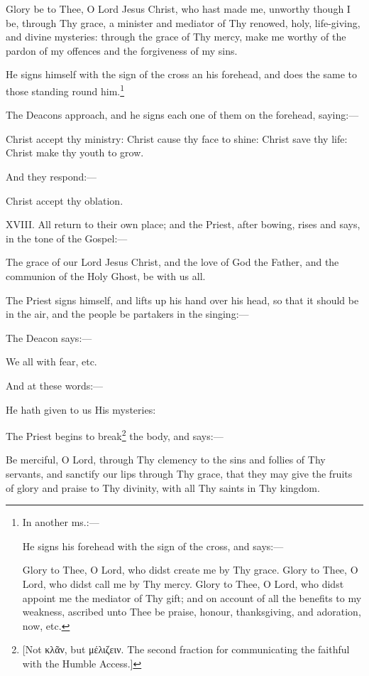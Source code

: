 Glory be to Thee, O Lord Jesus Christ, who hast made me, unworthy though I be, through Thy grace, a minister and mediator of Thy renowed, holy, life-giving, and divine mysteries: through the grace of Thy mercy, make me worthy of the pardon of my offences and the forgiveness of my sins.

He signs himself with the sign of the cross an his forehead, and does the same to those standing round him.\footnote{\par  In another ms.:—  \par He signs his forehead with the sign of the cross, and says:—  \par Glory to Thee, O Lord, who didst create me by Thy grace. Glory to Thee, O Lord, who didst call me by Thy mercy. Glory to Thee, O Lord, who didst appoint me the mediator of Thy gift; and on account of all the benefits to my weakness, ascribed unto Thee be praise, honour, thanksgiving, and adoration, now, etc.}

The Deacons approach, and he signs each one of them on the forehead, saying:—

Christ accept thy ministry: Christ cause thy face to shine: Christ save thy life: Christ make thy youth to grow.

And they respond:—

Christ accept thy oblation.

XVIII. All return to their own place; and the Priest, after bowing, rises and says, in the tone of the Gospel:—

The grace of our Lord Jesus Christ, and the love of God the Father, and the communion of the Holy Ghost, be with us all.

The Priest signs himself, and lifts up his hand over his head, so that it should be in the air, and the people be partakers in the singing:—

The Deacon says:—

We all with fear, etc.

And at these words:—

He hath given to us His mysteries:

The Priest begins to break\footnote{\par{}  [Not \textgreek{κλᾶν}, but \textgreek{μέλιζειν}. The second fraction for communicating the faithful with the Humble Access.]} the body, and says:—

Be merciful, O Lord, through Thy clemency to the sins and follies of Thy servants, and sanctify our lips through Thy grace, that they may give the fruits of glory and praise to Thy divinity, with all Thy saints in Thy kingdom.

